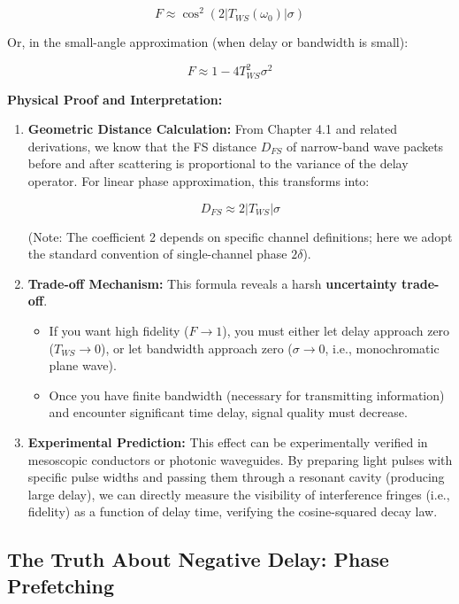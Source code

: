 \documentclass[11pt,a4paper,twoside]{book}
\begin{document}
$$F \approx \cos^2(2 |T_{WS}(\omega_0)| \sigma)$$

Or, in the small-angle approximation (when delay or bandwidth is small):

$$F \approx 1 - 4 T_{WS}^2 \sigma^2$$

\textbf{Physical Proof and Interpretation:}

\begin{enumerate}
\item \textbf{Geometric Distance Calculation:} From Chapter 4.1 and related derivations, we know that the FS distance $D_{FS}$ of narrow-band wave packets before and after scattering is proportional to the variance of the delay operator. For linear phase approximation, this transforms into:

   $$D_{FS} \approx 2 |T_{WS}| \sigma$$

   (Note: The coefficient 2 depends on specific channel definitions; here we adopt the standard convention of single-channel phase $2\delta$).

\item \textbf{Trade-off Mechanism:} This formula reveals a harsh \textbf{uncertainty trade-off}.

   \begin{itemize}
   \item If you want high fidelity ($F \to 1$), you must either let delay approach zero ($T_{WS} \to 0$), or let bandwidth approach zero ($\sigma \to 0$, i.e., monochromatic plane wave).

   \item Once you have finite bandwidth (necessary for transmitting information) and encounter significant time delay, signal quality must decrease.
   \end{itemize}

\item \textbf{Experimental Prediction:} This effect can be experimentally verified in mesoscopic conductors or photonic waveguides. By preparing light pulses with specific pulse widths and passing them through a resonant cavity (producing large delay), we can directly measure the visibility of interference fringes (i.e., fidelity) as a function of delay time, verifying the cosine-squared decay law.
\end{enumerate}

\subsection{The Truth About Negative Delay: Phase Prefetching}
\end{document}
